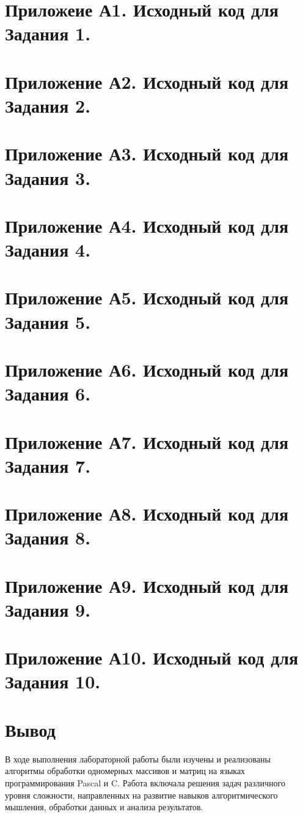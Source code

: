 \documentclass[oneside,a4paper,14pt]{extarticle}
\begin{document}
\section*{Приложеие А1. Исходный код для Задания 1.}
\newpage
\section*{Приложение А2. Исходный код для Задания 2.}
\newpage
\section*{Приложение А3. Исходный код для Задания 3.}
\newpage
\section*{Приложение А4. Исходный код для Задания 4.}
\newpage
\section*{Приложение А5. Исходный код для Задания 5.}
\newpage
\section*{Приложение А6. Исходный код для Задания 6.}
\newpage
\section*{Приложение А7. Исходный код для Задания 7.}
\newpage
\section*{Приложение А8. Исходный код для Задания 8.}
\newpage
\section*{Приложение А9. Исходный код для Задания 9.}
\newpage
\section*{Приложение А10. Исходный код для Задания 10.}
\newpage

\section*{Вывод}
В ходе выполнения лабораторной работы были изучены и реализованы алгоритмы
обработки одномерных массивов и матриц на языках программирования Pascal и C.
Работа включала решения задач различного уровня сложности, направленных на
развитие навыков алгоритмического мышления, обработки данных и анализа
результатов.\\
\end{document}
